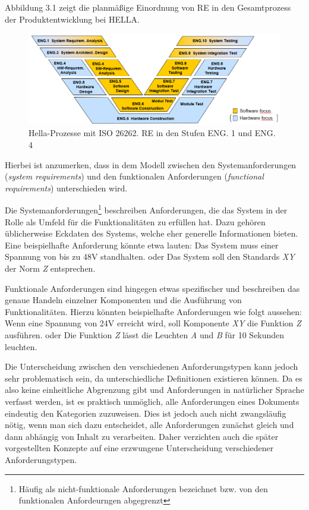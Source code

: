 \documentclass[12pt]{report}
\begin{document}
Abbildung 3.1 zeigt die planmäßige Einordnung von RE in den Gesamtprozess der Produktentwicklung bei HELLA. 

\begin{figure}[h!]
\begin{center}
\includegraphics[scale=0.7]{Bilder/V-Modell.png}
\caption{Hella-Prozesse mit ISO 26262. RE in den Stufen ENG. 1 und ENG. 4 \cite{ea19}}
\end{center}
\end{figure}

Hierbei ist anzumerken, dass in dem Modell zwischen den Systemanforderungen (\textit{system requirements}) und den funktionalen Anforderungen (\textit{functional requirements}) unterschieden wird. 

Die Systemanforderungen\footnote{Häufig als nicht-funktionale Anforderungen bezeichnet bzw. von den funktionalen Anfordeurngen abgegrenzt} beschreiben Anforderungen, die das System in der Rolle als Umfeld für die Funktionalitäten zu erfüllen hat. Dazu gehören üblicherweise Eckdaten des Systems, welche eher generelle Informationen bieten. Eine beispielhafte Anforderung könnte etwa lauten: \glqq Das System muss einer Spannung von bis zu 48V standhalten.\grqq{} oder \glqq Das System soll den Standards \textit{XY} der Norm \textit{Z} entsprechen.\grqq

Funktionale Anforderungen sind hingegen etwas spezifischer und beschreiben das genaue Handeln einzelner Komponenten und die Ausführung von Funktionalitäten. Hierzu könnten beispielhafte Anforderungen wie folgt aussehen: \glqq Wenn eine Spannung von 24V erreicht wird, soll Komponente \textit{XY} die Funktion \textit{Z} ausführen.\grqq{} oder \glqq Die Funktion \textit{Z} lässt die Leuchten \textit{A} und \textit{B} für 10 Sekunden leuchten.\grqq

Die Unterscheidung zwischen den verschiedenen Anforderungstypen kann jedoch sehr problematisch sein, da unterschiedliche Definitionen existieren können. Da es also keine einheitliche Abgrenzung gibt und Anforderungen in natürlicher Sprache verfasst werden, ist es praktisch unmöglich, alle Anforderungen eines Dokuments eindeutig den Kategorien zuzuweisen. Dies ist jedoch auch nicht zwangsläufig nötig, wenn man sich dazu entscheidet, alle Anforderungen zunächst gleich und dann abhängig von Inhalt zu verarbeiten. Daher verzichten auch die später vorgestellten Konzepte auf eine erzwungene Unterscheidung verschiedener Anforderungstypen.
\end{document}
